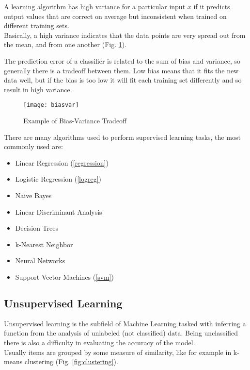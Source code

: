 \begin{itemize}
	A learning algorithm has high variance for a particular input $x$ if it predicts output values that are correct on average but inconsistent when trained on different training sets. \\
	Basically, a high variance indicates that the data points are very spread out from the mean, and from one another (Fig. \ref{fig:biasvar}).
	
	The prediction error of a classifier is related to the sum of bias and variance, so generally there is a tradeoff between them. Low bias means that it fits the new data well, but if the bias is too low it will fit each training set differently and so result in high variance.
	
	\begin{figure}[H]
		\centering
		\texttt{[image: biasvar]}
		\caption{Example of Bias-Variance Tradeoff \cite{biasvarTradeoff}}
		\label{fig:biasvar}
	\end{figure}	
\end{itemize}

There are many algorithms used to perform supervised learning tasks, the most commonly used are:

\begin{itemize}[noitemsep, topsep = -5pt]
	\item Linear Regression (\ref{regression})
	\item Logistic Regression (\ref{logreg})
	\item Naive Bayes
	\item Linear Discriminant Analysis
	\item Decision Trees
	\item k-Nearest Neighbor
	\item Neural Networks
	\item Support Vector Machines (\ref{svm})
\end{itemize}


\subsection{Unsupervised Learning} \label{unsupervised}
Unsupervised learning is the subfield of Machine Learning tasked with inferring a function from the analysis of unlabeled (not classified) data. Being unclassified there is also a difficulty in evaluating the accuracy of the model.\\
Usually items are grouped by some measure of similarity, like for example in k-means clustering (Fig. \ref{fig:clustering}).

